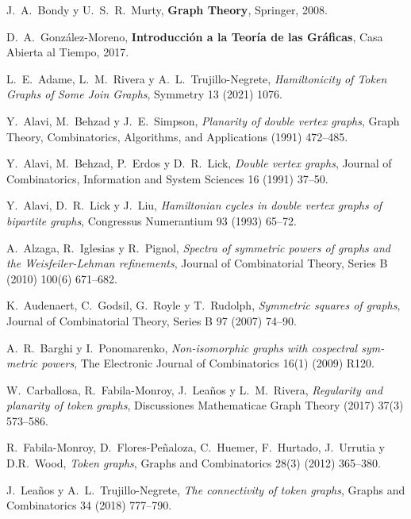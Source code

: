 \begin{thebibliography}{99}

  J.~A.~Bondy y U.~S.~R.~Murty,
  \textbf{Graph Theory},
  Springer, 2008.

  D.~A.~Gonz\'alez-Moreno,
  \textbf{Introducci\'on a la Teor\'ia de las Gr\'aficas},
  Casa Abierta al Tiempo, 2017.

  L.~E.~Adame, L.~M.~Rivera y A.~L.~Trujillo-Negrete,
  \textit{Hamiltonicity of Token Graphs of Some Join Graphs},
  Symmetry 13 (2021) 1076. 

  Y.~Alavi, M.~Behzad y J.~E.~Simpson,
  \textit{Planarity of double vertex graphs},
  Graph Theory, Combinatorics, Algorithms, and Applications (1991) 472--485.

 Y.~Alavi, M.~Behzad, P.~Erdos y D.~R.~Lick,
 \textit{Double vertex graphs},
 Journal of Combinatorics, Information and System Sciences 16 (1991) 37--50.

 Y.~Alavi, D.~R.~Lick y J.~Liu,
 \textit{Hamiltonian cycles in double vertex graphs of bipartite graphs},
 Congressus Numerantium 93 (1993) 65--72.

  A.~Alzaga, R.~Iglesias y  R.~Pignol,
  \textit{Spectra of symmetric powers of graphs and
  the Weisfeiler-Lehman refinements},
  Journal of Combinatorial Theory, Series B (2010) 100(6) 671--682. 

  K.~Audenaert, C.~Godsil, G.~Royle y T.~Rudolph,
  \textit{Symmetric squares of graphs},
  Journal of Combinatorial Theory, Series B 97 (2007) 74--90. 

  A.~R.~Barghi y I.~Ponomarenko,
  \textit{Non-isomorphic graphs with cospectral sym-
  metric powers},
  The Electronic Journal of Combinatorics 16(1) (2009) R120.

  W.~Carballosa, R.~Fabila-Monroy, J.~Lea\~{n}os y L.~M.~Rivera,
  \textit{Regularity and
  planarity of token graphs},
  Discussiones Mathematicae Graph Theory (2017) 37(3) 573--586. 

  R.~Fabila-Monroy, D.~Flores-Pe\~{n}aloza, C.~Huemer, F.~Hurtado, J.~Urrutia y
D.R.~Wood,
  \textit{Token graphs},
  Graphs and Combinatorics 28(3) (2012) 365--380. 

  J.~Lea\~{n}os y A.~L.~Trujillo-Negrete,
  \textit{The connectivity of token graphs},
  Graphs and Combinatorics 34 (2018) 777--790. 


\end{thebibliography}
